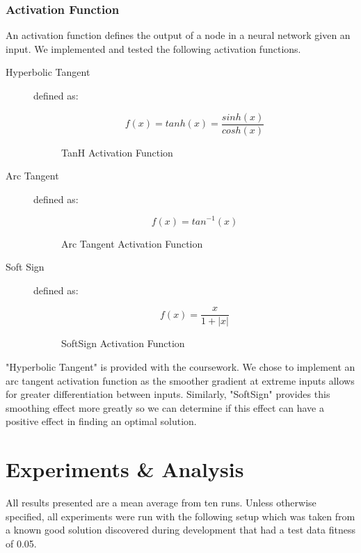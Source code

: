 \documentclass[sigconf]{acmart}
\begin{document}
\subsubsection{Activation Function}
An activation function defines the output of a node in a neural network given an input. We implemented and tested the following activation functions.
\begin{description}
\item[Hyperbolic Tangent] defined as:
\begin{figure}[!htb]
\begin{equation}
f(x) = tanh(x) = \frac{sinh(x)}{cosh(x)}
\end{equation}
\caption{TanH Activation Function}
\label{fig:SoftSign}
\end{figure}

\item[Arc Tangent] defined as:
\begin{figure}[!htb]
\begin{equation}
f(x) = tan{}^{-1}(x)
\end{equation}
\caption{Arc Tangent Activation Function}
\label{fig:SoftSign}
\end{figure}
\item[Soft Sign] defined as:
\begin{figure}[!htb]
\begin{equation}
f(x) = \frac{x}{1+|x|}
\end{equation}
\caption{SoftSign Activation Function}
\label{fig:SoftSign}
\end{figure}
\end{description}

"Hyperbolic Tangent" is provided with the coursework. We chose to implement an arc tangent activation function as the smoother gradient at extreme inputs allows for greater differentiation between inputs. Similarly, "SoftSign" provides this smoothing effect more greatly so we can determine if this effect can have a positive effect in finding an optimal solution.

\section{Experiments \& Analysis}
All results presented are a mean average from ten runs. Unless otherwise specified, all experiments were run with the following setup which was taken from a known good solution discovered during development that had a test data fitness of 0.05.
\end{document}
